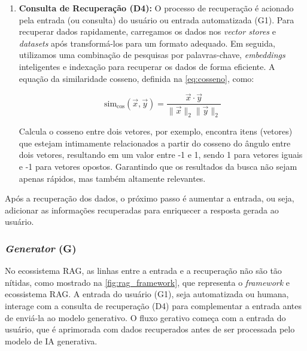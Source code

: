 \documentclass[a4paper, 12pt]{article}
\begin{document}
\begin{enumerate}
        \item \textbf{Consulta de Recuperação (D4):} \label{sec:recovery} O processo de recuperação é acionado pela entrada (ou consulta) do usuário ou entrada automatizada (G1). Para recuperar dados rapidamente, carregamos os dados nos \textit{vector stores} e \textit{datasets} após transformá-los para um formato adequado. Em seguida, utilizamos uma combinação de pesquisas por palavras-chave, \textit{embeddings} inteligentes e indexação para recuperar os dados de forma eficiente.
        A equação da similaridade cosseno, definida na \autoref{eq:cosseno}, como: 
        
        \begin{equation}
            \text{sim}_{\cos}(\vec{x}, \vec{y}) = \frac{\vec{x} \cdot \vec{y}}{\|\vec{x}\|_2 \|\vec{y}\|_2}
            \label{eq:cosseno}
        \end{equation}
        
        Calcula o cosseno entre dois vetores, por exemplo, encontra itens (vetores) que estejam intimamente relacionados a partir do cosseno do ângulo entre dois vetores, resultando em um valor entre -1 e 1, sendo 1 para vetores iguais e -1 para vetores opostos. Garantindo que os resultados da busca não sejam apenas rápidos, mas também altamente relevantes.
    \end{enumerate}

    Após a recuperação dos dados, o próximo passo é aumentar a entrada, ou seja, adicionar as informações recuperadas para enriquecer a resposta gerada ao usuário.

    \subsubsection{\textit{Generator} (G)}

    No ecossistema RAG, as linhas entre a entrada e a recuperação não são tão nítidas, como mostrado na \autoref{fig:rag_framework}, que representa o \textit{framework} e ecossistema RAG. A entrada do usuário (G1), seja automatizada ou humana, interage com a consulta de recuperação (D4) para complementar a entrada antes de enviá-la ao modelo generativo. O fluxo gerativo começa com a entrada do usuário, que é aprimorada com dados recuperados antes de ser processada pelo modelo de IA generativa.
\end{document}
